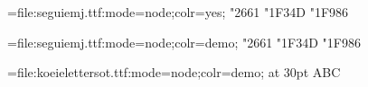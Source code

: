 \documentclass{article}
\begin{document}
\font\Emoj={file:seguiemj.ttf:mode=node;colr=yes;}
     \Emoj \char"2661 \char"1F34D \char"1F986
     
\font\Emoj={file:seguiemj.ttf:mode=node;colr=demo;}
     \Emoj \char"2661 \char"1F34D \char"1F986

\font\cow={file:koeielettersot.ttf:mode=node;colr=demo;} at 30pt
    \cow ABC
\end{document}
